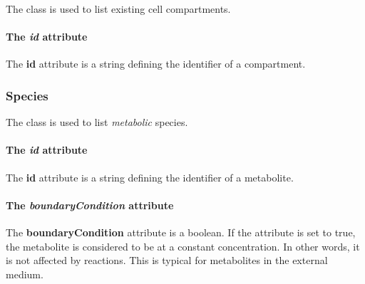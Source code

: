 The \compartment{} class is used to list existing cell compartments.

\paragraph{The \textit{id} attribute}
The \textbf{id} attribute is a string defining the identifier of a compartment.

\subsubsection{Species}
\label{sec:species}

The \species{} class is used to list \emph{metabolic} species.

\paragraph{The \textit{id} attribute}
The \textbf{id} attribute is a string defining the identifier of a metabolite.

\paragraph{The \textit{boundaryCondition} attribute}
The \textbf{boundaryCondition} attribute is a boolean.
If the attribute is set to true, the metabolite is considered to be at
a constant concentration.
In other words, it is not affected by reactions.
This is typical for metabolites in the external medium.

